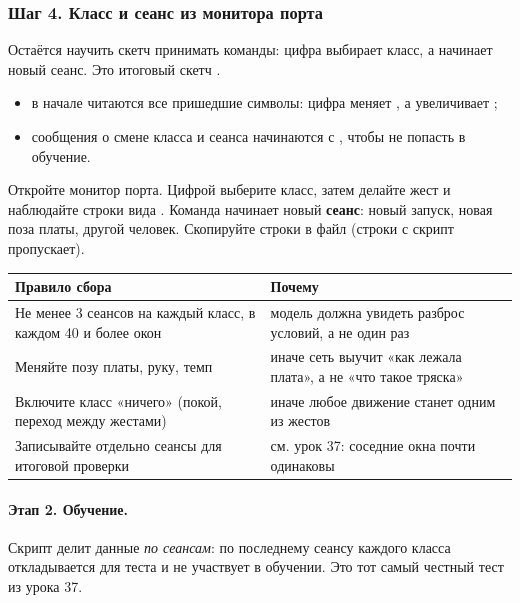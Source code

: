 \subsubsection{Шаг 4. Класс и сеанс из монитора порта}

Остаётся научить скетч принимать команды: цифра выбирает класс, а  начинает новый сеанс.
Это итоговый скетч .


\begin{itemize}[leftmargin=*]
  \item в начале  читаются все пришедшие символы: цифра меняет , а 
        увеличивает ;
  \item сообщения о смене класса и сеанса начинаются с \code{\#}, чтобы не попасть в обучение.
\end{itemize}

Откройте монитор порта. Цифрой выберите класс, затем делайте жест и наблюдайте строки вида
. Команда  начинает новый
\textbf{сеанс}: новый запуск, новая поза платы, другой человек. Скопируйте строки в файл
 (строки с \code{\#} скрипт пропускает).

\begin{center}\small
\begin{tabularx}{\textwidth}{@{}l X@{}}
\toprule
Правило сбора & Почему \\
\midrule
Не менее 3 сеансов на каждый класс, в каждом 40 и более окон & модель должна увидеть разброс условий, а не один раз \\
Меняйте позу платы, руку, темп & иначе сеть выучит «как лежала плата», а не «что такое тряска» \\
Включите класс «ничего» (покой, переход между жестами) & иначе любое движение станет одним из жестов \\
Записывайте отдельно сеансы для итоговой проверки & см. урок 37: соседние окна почти одинаковы \\
\bottomrule
\end{tabularx}
\end{center}

\paragraph{Этап 2. Обучение.} Скрипт делит данные \emph{по сеансам}: по последнему сеансу каждого
класса откладывается для теста и не участвует в обучении. Это тот самый честный тест из урока 37.

